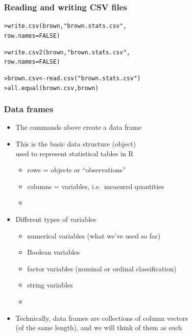 \documentclass[t]{beamer} %
\begin{document}
\begin{frame}[fragile]
  \frametitle{Reading and writing CSV files}
  
  \ungap[1.5]
\begin{alltt}
> write.csv(brown, "brown.stats.csv",
  row.names=FALSE)

> write.csv2(brown, "brown.stats.csv",
  row.names=FALSE)


> brown.csv <- read.csv("brown.stats.csv")
> all.equal(brown.csv, brown)
\end{alltt}

\end{frame}


\begin{frame}
  \frametitle{Data frames}

  \begin{itemize}
  \item The commands above create a \h{data frame}
  \item This is the basic data structure (object)\\
    used to represent statistical tables in R
    \begin{itemize}
    \item rows = objects or ``observations''
    \item columns = variables, i.e.\ measured quantities
    \item[]
    \end{itemize}
  \item Different types of variables
    \begin{itemize}
    \item numerical variables (what we've used so far)
    \item Boolean variables
    \item factor variables (nominal or ordinal classification)
    \item string variables
    \item[]
    \end{itemize}
  \item Technically, data frames are collections of column vectors\\
    (of the same length), and we will think of them as such
  \end{itemize}

\end{frame}
\end{document}
